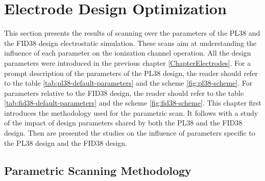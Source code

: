 
\chapter{Electrode Design Optimization} %

\label{ChapterElectrodesScan} %


This section presents the results of scanning over the parameters of the PL38 and the FID38 design electrostatic simulation. These scans aim at understanding the influence  of each parameter on the ionization channel operation. All the design parameters were introduced in the previous chapter \ref{ChapterElectrodes}. For a prompt description of the parameters of the PL38 design, the reader should refer to the table \ref{tab:pl38-default-parameters} and the scheme \ref{fig:pl38-scheme}. For parameters relative to the FID38 design, the reader should refer to the table \ref{tab:fid38-default-parameters} and the scheme \ref{fig:fid38-scheme}. 
This chapter first introduces the methodology used for the parametric scan. It follows with a study of the impact of design parameters shared by both the PL38 and the FID38 design. Then are presented the studies on the influence of parameters specific to the PL38 design and the FID38 design.


\section{Parametric Scanning Methodology}

